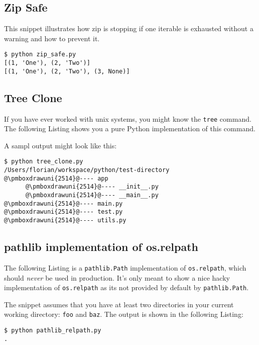 \subsection{Zip Safe}

This snippet illustrates how zip is stopping if one iterable is exhausted without a warning and how to prevent it.



\begin{lstlisting}[caption=Output of zip\_safe.py]
$ python zip_safe.py
[(1, 'One'), (2, 'Two')]
[(1, 'One'), (2, 'Two'), (3, None)]
\end{lstlisting}


\subsection{Tree Clone}

If you have ever worked with unix systems, you might know the \lstinline{tree} command.
The following Listing shows you a pure Python implementation of this command.



A sampl output might look like this:

\begin{lstlisting}[caption=Output of tree\_clone.py,escapechar=@]
$ python tree_clone.py
/Users/florian/workspace/python/test-directory
@\pmboxdrawuni{2514}@---- app
      @\pmboxdrawuni{2514}@---- __init__.py
      @\pmboxdrawuni{2514}@---- __main__.py
@\pmboxdrawuni{2514}@---- main.py
@\pmboxdrawuni{2514}@---- test.py
@\pmboxdrawuni{2514}@---- utils.py
\end{lstlisting}


\subsection{pathlib implementation of os.relpath}

The following Listing is a \lstinline{pathlib.Path} implementation of \lstinline{os.relpath}, which should \textit{never} be used in production.
It's only meant to show a nice hacky implementation of \lstinline{os.relpath} as its not provided by default by \lstinline{pathlib.Path}.



The snippet assumes that you have at least two directories in your current working directory: \lstinline{foo} and \lstinline{baz}.
The output is shown in the following Listing:

\begin{lstlisting}[caption=Output of pathlib\_relpath.py]
$ python pathlib_relpath.py
.
\end{lstlisting}
